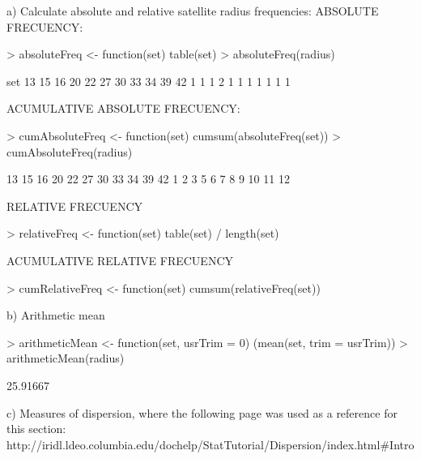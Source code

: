 \documentclass[a4paper]{article}
\begin{document}
		a) Calculate absolute and relative satellite radius frequencies:
ABSOLUTE FRECUENCY:
\begin{Schunk}
\begin{Sinput}
> absoluteFreq    <- function(set) {table(set)}
> absoluteFreq(radius)
\end{Sinput}
\begin{Soutput}
set
13 15 16 20 22 27 30 33 34 39 42 
 1  1  1  2  1  1  1  1  1  1  1 
\end{Soutput}
\end{Schunk}
ACUMULATIVE ABSOLUTE FRECUENCY:
\begin{Schunk}
\begin{Sinput}
> cumAbsoluteFreq <- function(set) {cumsum(absoluteFreq(set))}
> cumAbsoluteFreq(radius)
\end{Sinput}
\begin{Soutput}
13 15 16 20 22 27 30 33 34 39 42 
 1  2  3  5  6  7  8  9 10 11 12 
\end{Soutput}
\end{Schunk}
RELATIVE FRECUENCY
\begin{Schunk}
\begin{Sinput}
> relativeFreq <- function(set) {table(set) / length(set)}
\end{Sinput}
\end{Schunk}
ACUMULATIVE RELATIVE FRECUENCY
\begin{Schunk}
\begin{Sinput}
> cumRelativeFreq <- function(set) {cumsum(relativeFreq(set))}
\end{Sinput}
\end{Schunk}

		b) Arithmetic mean
\begin{Schunk}
\begin{Sinput}
> arithmeticMean <- function(set, usrTrim = 0) (mean(set, trim = usrTrim))
> arithmeticMean(radius)
\end{Sinput}
\begin{Soutput}
[1] 25.91667
\end{Soutput}
\end{Schunk}

		c) Measures of dispersion, where the following page was used as a reference for this section:
		http://iridl.ldeo.columbia.edu/dochelp/StatTutorial/Dispersion/index.html#Intro
\end{document}
